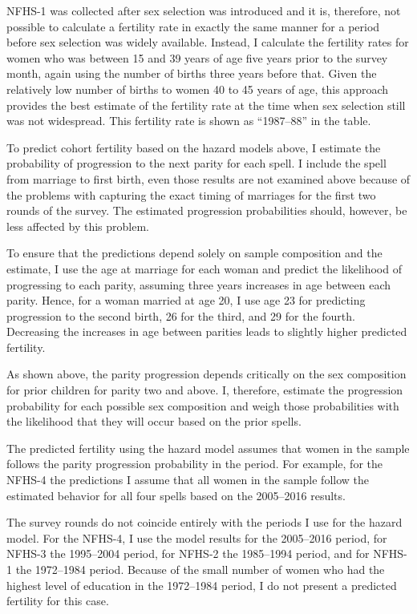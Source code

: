 \documentclass[12pt,letterpaper]{article}
\begin{document}
NFHS-1 was collected after sex selection was introduced and it is, therefore, not 
possible to calculate a fertility rate in exactly the same manner for a period before 
sex selection was widely available.
Instead, I calculate the fertility rates for women who was between 15 and 39 years of
age five years prior to the survey month, again using the number of births three years 
before that.
Given the relatively low number of births to women 40 to 45 years of age, this approach 
provides the best estimate of the fertility rate at the time when sex selection still was 
not widespread.
This fertility rate is shown as ``1987--88'' in the table.


To predict cohort fertility based on the hazard models above, I estimate the probability 
of progression to the next parity for each spell.
I include the spell from marriage to first birth, even those results are not examined 
above because of the problems with capturing the exact timing of marriages for the first 
two rounds of the survey.
The estimated progression probabilities should, however, be less affected by this
problem.

To ensure that the predictions depend solely on sample composition and the estimate, I
use the age at marriage for each woman and predict the likelihood of progressing to
each parity, assuming three years increases in age between each parity.
Hence, for a woman married at age 20, I use age 23 for predicting progression 
to the second birth, 26 for the third, and 29 for the fourth.
Decreasing the increases in age between parities leads to slightly higher predicted 
fertility.

As shown above, the parity progression depends critically on the sex composition for prior 
children for parity two and above.
I, therefore, estimate the progression probability for each possible sex composition
and weigh those probabilities with the likelihood that they will occur based on the
prior spells.

The predicted fertility using the hazard model assumes that women in the sample
follows the parity progression probability in the period. 
For example, for the NFHS-4 the predictions I assume that all women in the sample follow
the estimated behavior for all four spells based on the 2005--2016 results.

The survey rounds do not coincide entirely with the periods I use for the hazard model.
For the NFHS-4, I use the model results for the 2005--2016 period, 
for NFHS-3 the 1995--2004 period, 
for NFHS-2 the 1985--1994 period, 
and for NFHS-1 the 1972--1984 period.
Because of the small number of women who had the highest level of education in the
1972--1984 period, I do not present a predicted fertility for this case.
\end{document}
